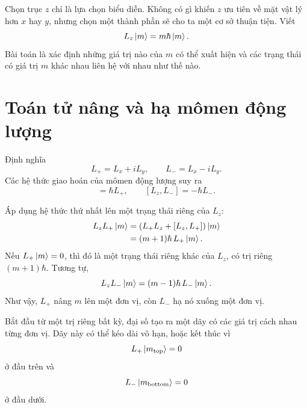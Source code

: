 Chọn trục \(z\) chỉ là lựa chọn biểu diễn. Không có gì khiến \(z\) ưu tiên về mặt vật lý hơn \(x\) hay \(y\), nhưng chọn một thành phần sẽ cho ta một cơ sở thuận tiện. Viết
\begin{equation}
L_z\left\lvert m\right\rangle=m\hbar\left\lvert m\right\rangle.
\end{equation}
Bài toán là xác định những giá trị nào của \(m\) có thể xuất hiện và các trạng thái có giá trị \(m\) khác nhau liên hệ với nhau như thế nào.

\begin{classroomqa}
\end{classroomqa}

\section{Toán tử nâng và hạ mômen động lượng}

Định nghĩa
\begin{equation}
L_+=L_x+iL_y,
\qquad
L_-=L_x-iL_y.
\end{equation}
Các hệ thức giao hoán của mômen động lượng suy ra
\begin{equation}
[L_z,L_+]=\hbar L_+,
\qquad
[L_z,L_-]=-\hbar L_-.
\end{equation}

Áp dụng hệ thức thứ nhất lên một trạng thái riêng của \(L_z\):
\begin{align}
L_zL_+\left\lvert m\right\rangle
&=\left(L_+L_z+[L_z,L_+]\right)\left\lvert m\right\rangle\\
&=(m+1)\hbar\,L_+\left\lvert m\right\rangle.
\end{align}
Nếu \(L_+\left\lvert m\right\rangle=0\), thì đó là một trạng thái riêng khác của \(L_z\), có trị riêng \((m+1)\hbar\). Tương tự,
\begin{equation}
L_zL_-\left\lvert m\right\rangle
=(m-1)\hbar\,L_-\left\lvert m\right\rangle.
\end{equation}
Như vậy, \(L_+\) nâng \(m\) lên một đơn vị, còn \(L_-\) hạ nó xuống một đơn vị.

Bắt đầu từ một trị riêng bất kỳ, đại số tạo ra một dãy có các giá trị cách nhau từng đơn vị. Dãy này có thể kéo dài vô hạn, hoặc kết thúc vì
\begin{equation}
L_+\left\lvert m_{\mathrm{top}}\right\rangle=0
\end{equation}
ở đầu trên và
\begin{equation}
L_-\left\lvert m_{\mathrm{bottom}}\right\rangle=0
\end{equation}
ở đầu dưới.

